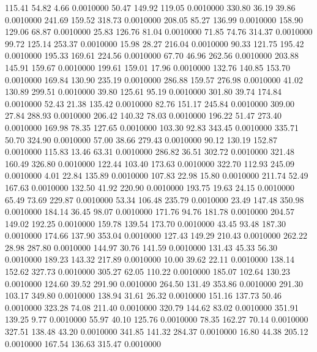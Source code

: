 115.41   54.82    4.66   0.0010000
  50.47  149.92  119.05   0.0010000
 330.80   36.19   39.86   0.0010000
 241.69  159.52  318.73   0.0010000
 208.05   85.27  136.99   0.0010000
 158.90  129.06   68.87   0.0010000
  25.83  126.76   81.04   0.0010000
  71.85   74.76  314.37   0.0010000
  99.72  125.14  253.37   0.0010000
  15.98   28.27  216.04   0.0010000
  90.33  121.75  195.42   0.0010000
 195.33  169.61  224.56   0.0010000
  67.70   46.96  262.56   0.0010000
 203.88  145.91  159.67   0.0010000
 199.61  159.01   17.96   0.0010000
 132.76  140.85  153.70   0.0010000
 169.84  130.90  235.19   0.0010000
 286.88  159.57  276.98   0.0010000
  41.02  130.89  299.51   0.0010000
  39.80  125.61   95.19   0.0010000
 301.80   39.74  174.84   0.0010000
  52.43   21.38  135.42   0.0010000
  82.76  151.17  245.84   0.0010000
 309.00   27.84  288.93   0.0010000
 206.42  140.32   78.03   0.0010000
 196.22   51.47  273.40   0.0010000
 169.98   78.35  127.65   0.0010000
 103.30   92.83  343.45   0.0010000
 335.71   50.70  324.90   0.0010000
  57.00   38.66  279.43   0.0010000
  90.12  130.19  152.87   0.0010000
 115.83   13.46   63.31   0.0010000
 286.82   36.51  302.72   0.0010000
 321.48  160.49  326.80   0.0010000
 122.44  103.40  173.63   0.0010000
 322.70  112.93  245.09   0.0010000
   4.01   22.84  135.89   0.0010000
 107.83   22.98   15.80   0.0010000
 211.74   52.49  167.63   0.0010000
 132.50   41.92  220.90   0.0010000
 193.75   19.63   24.15   0.0010000
  65.49   73.69  229.87   0.0010000
  53.34  106.48  235.79   0.0010000
  23.49  147.48  350.98   0.0010000
 184.14   36.45   98.07   0.0010000
 171.76   94.76  181.78   0.0010000
 204.57  149.02  192.25   0.0010000
 159.78  139.54  173.70   0.0010000
  43.45   93.48  187.30   0.0010000
 174.66  137.90  353.04   0.0010000
 127.43  149.29  210.43   0.0010000
 262.22   28.98  287.80   0.0010000
 144.97   30.76  141.59   0.0010000
 131.43   45.33   56.30   0.0010000
 189.23  143.32  217.89   0.0010000
  10.00   39.62   22.11   0.0010000
 138.14  152.62  327.73   0.0010000
 305.27   62.05  110.22   0.0010000
 185.07  102.64  130.23   0.0010000
 124.60   39.52  291.90   0.0010000
 264.50  131.49  353.86   0.0010000
 291.30  103.17  349.80   0.0010000
 138.94   31.61   26.32   0.0010000
 151.16  137.73   50.46   0.0010000
 323.28   74.08  211.40   0.0010000
 320.79  144.62   83.02   0.0010000
 351.91  139.25    9.77   0.0010000
  55.97   40.10  125.76   0.0010000
  78.35  162.27   70.14   0.0010000
 327.51  138.48   43.20   0.0010000
 341.85  141.32  284.37   0.0010000
  16.80   44.38  205.12   0.0010000
 167.54  136.63  315.47   0.0010000

